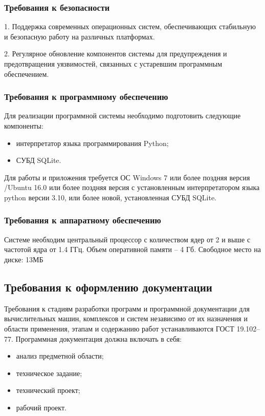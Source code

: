 \subsubsection{Требования к безопасности}
1. Поддержка современных операционных систем, обеспечивающих стабильную и безопасную работу на различных платформах.

2. Регулярное обновление компонентов системы для предупреждения и предотвращения уязвимостей, связанных с устаревшим программным обеспечением.

\subsubsection{Требования к программному обеспечению}

Для реализации программной системы необходимо подготовить следующие компоненты:
\begin{itemize}
	\item интерпретатор языка программирования Python;
	\item СУБД SQLite.
\end{itemize}

Для работы и приложения требуется ОС Windows 7 или более поздняя версия /Ubuntu 16.0 или более поздняя версия с установленным интерпретатором языка python версии 3.10, или более новой, установленная СУБД SQLite.

\subsubsection{Требования к аппаратному обеспечению}
Системе необходим центральный процессор с количеством ядер от 2 и выше с частотой ядра от 1.4 ГГц. Объем оперативной памяти – 4 Гб.
Свободное место на диске: 13МБ

\subsection{Требования к оформлению документации}

Требования к стадиям разработки программ и программной документации для вычислительных машин, комплексов и систем независимо от их
назначения и области применения, этапам и содержанию работ устанавливаются ГОСТ  19.102–77. Программная документация должна включать в себя:
\begin{itemize}
	\item анализ предметной области;
	\item техническое задание;
	\item технический проект;
	\item рабочий проект.
\end{itemize}
